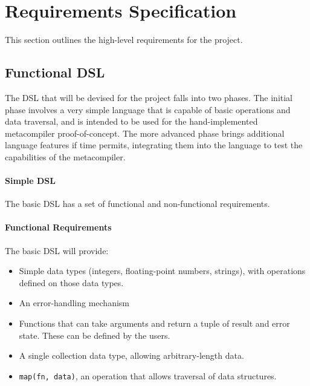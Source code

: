 \documentclass[a4paper,11pt]{report}
\begin{document}


\chapter{Requirements Specification} %
\label{cha:requirements_specification}
This section outlines the high-level requirements for the project.

\section{Functional DSL} %
\label{sec:functional_dsl}
The DSL that will be devised for the project falls into two phases. 
The initial phase involves a very simple language that is capable of basic operations and data traversal, and is intended to be used for the hand-implemented metacompiler proof-of-concept.
The more advanced phase brings additional language features if time permits, integrating them into the language to test the capabilities of the metacompiler.

\subsubsection{Simple DSL} %
\label{ssub:simple_dsl}
The basic DSL has a set of functional and non-functional requirements.

\subsubsection{Functional Requirements} %
\label{ssub:functional_requirements_simple}
The basic DSL will provide:
\begin{itemize}
    \item Simple data types (integers, floating-point numbers, strings), with operations defined on those data types.
    \item An error-handling mechanism
    \item Functions that can take arguments and return a tuple of result and error state. 
    These can be defined by the users.
    \item A single collection data type, allowing arbitrary-length data.
    \item \lstinline{map(fn, data)}, an operation that allows traversal of data structures.
\end{itemize}
\end{document}
